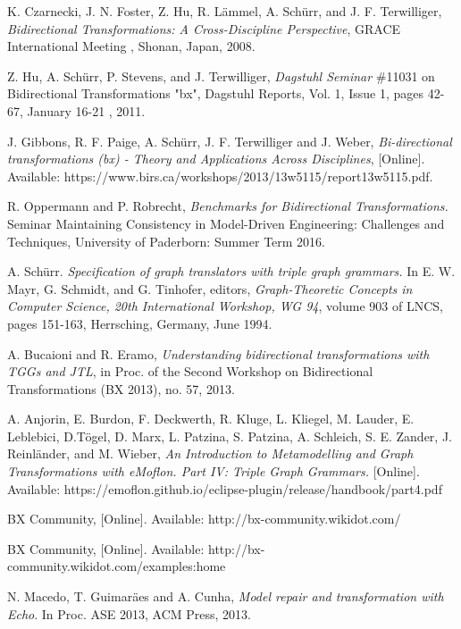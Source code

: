 \begin{thebibliography}{1}
	
	 K. Czarnecki, J. N. Foster, Z. Hu, R. L\"ammel, A. Sch\"urr, and J. F. Terwilliger,  {\em Bidirectional Transformations: A Cross-Discipline Perspective}, GRACE International Meeting , Shonan, Japan, 2008.
	
	 Z. Hu, A. Sch\"urr, P. Stevens, and J. Terwilliger,  {\em Dagstuhl Seminar} \#11031 on Bidirectional Transformations "bx", Dagstuhl Reports, Vol. 1, Issue 1, pages 42-67, January 16-21 , 2011.
	
	 J. Gibbons, R. F. Paige, A. Sch\"urr, J. F. Terwilliger and J. Weber, {\em Bi-directional transformations (bx) - Theory and Applications Across Disciplines}, [Online]. Available:  https://www.birs.ca/workshops/2013/13w5115/report13w5115.pdf.

	 R. Oppermann and P. Robrecht, {\em Benchmarks for Bidirectional Transformations.} Seminar Maintaining Consistency in Model-Driven Engineering: Challenges and Techniques, University of Paderborn: Summer Term 2016.
	
	 A. Sch\"urr. {\em Specification of graph translators with triple graph grammars.} In E. W. Mayr, G. Schmidt, and G. Tinhofer, editors, {\em Graph-Theoretic
	Concepts in Computer Science, 20th International Workshop, WG 94}, volume 903 of LNCS, pages 151-163, Herrsching, Germany, June 1994.
	
	 A. Bucaioni and R. Eramo, {\em Understanding bidirectional transformations with TGGs and JTL}, in Proc. of the Second Workshop on Bidirectional Transformations (BX 2013), no. 57, 2013.
	
	 A. Anjorin, E. Burdon, F. Deckwerth, R. Kluge, L. Kliegel, M. Lauder, E. Leblebici, D.T\"ogel, D. Marx, L. Patzina, S. Patzina, A. Schleich, S. E. Zander, J. Reinl\"ander, and M. Wieber, {\em An Introduction to	Metamodelling and Graph Transformations with eMoflon. Part IV: Triple Graph Grammars.} [Online]. Available: 
	https://emoflon.github.io/eclipse-plugin/release/handbook/part4.pdf
    
     BX Community, [Online]. Available: http://bx-community.wikidot.com/
    
     BX Community, [Online]. Available: http://bx-community.wikidot.com/examples:home
    
     N. Macedo, T. Guimar\"aes and A. Cunha, {\em Model repair and transformation with Echo}. In Proc. ASE 2013, ACM Press, 2013.
    

\end{thebibliography}
